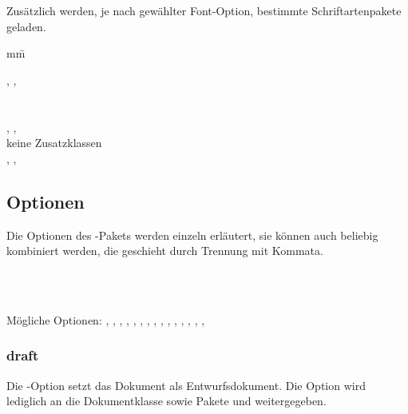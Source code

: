 Zusätzlich werden, je nach gewählter Font-Option, bestimmte Schriftartenpakete geladen.
\begin{tabbing}
	mm\=\kill

	\>, , \\
	\>\\
	\>\\
	\>, , \\
	\>keine Zusatzklassen\\
	\>, , 
\end{tabbing}


\subsection{Optionen}
\label{sec:userdoc:options}

Die Optionen des -Pakets werden einzeln erläutert, sie können auch beliebig kombiniert werden, die geschieht durch Trennung mit Kommata.

\begin{nutzung}
		\>\\
	\beispiel
		\>\\
		\>
\end{nutzung}

Mögliche Optionen: , , , , , , , , , , , , , , , 

\subsubsection{draft}

Die -Option setzt das Dokument als Entwurfsdokument.
Die Option wird lediglich an die Dokumentklasse sowie Pakete  und  weitergegeben.

\begin{nutzung}
		\>\\
\end{nutzung}

